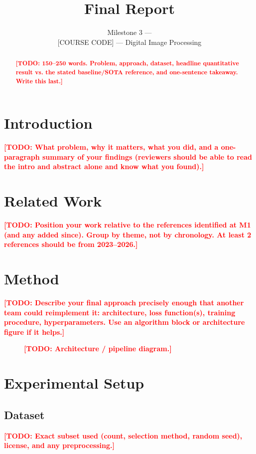 \documentclass[11pt]{article}
\title{\LARGE \todo{Project Title} \\[4pt]
\large Final Report}
\author{
  \todo{Student A Full Name} \and
  \todo{Student B Full Name} \and
  \todo{Student C Full Name}
}
\date{Milestone 3 --- \todo{Date} \\{} [COURSE CODE] --- Digital Image Processing}
\newcommand{\todo}[1]{\textcolor{red}{\textbf{[TODO: #1]}}}
\begin{document}
\maketitle

\begin{abstract}
\todo{150--250 words. Problem, approach, dataset, headline quantitative result vs.
the stated baseline/SOTA reference, and one-sentence takeaway. Write this last.}
\end{abstract}

\section{Introduction}
\label{sec:intro}
\todo{What problem, why it matters, what you did, and a one-paragraph summary of your
findings (reviewers should be able to read the intro and abstract alone and know what
you found).}

\section{Related Work}
\label{sec:related}
\todo{Position your work relative to the references identified at M1 (and any added
since). Group by theme, not by chronology. At least 2 references should be from
2023--2026.}

\section{Method}
\label{sec:method}
\todo{Describe your final approach precisely enough that another team could
reimplement it: architecture, loss function(s), training procedure, hyperparameters.
Use an algorithm block or architecture figure if it helps.}

\begin{figure}[h]
\centering
\caption{\todo{Architecture / pipeline diagram.}}
\label{fig:arch}
\end{figure}

\section{Experimental Setup}
\label{sec:setup}

\subsection{Dataset}
\todo{Exact subset used (count, selection method, random seed), license, and any
preprocessing.}
\end{document}

